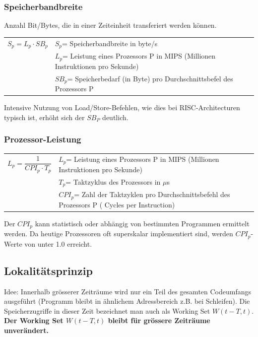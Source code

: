 \subsubsection{Speicherbandbreite}
Anzahl Bit/Bytes, die in einer Zeiteinheit transferiert werden können.\newline
\begin{tabular}{cl}
    $ S_p = L_p \cdot SB_p $&$ S_p $= Speicherbandbreite in byte/s\\
    & $ L_p $= Leistung eines Prozessors P in MIPS (Millionen Instruktionen pro Sekunde)\\
    &$ SB_p $= Speicherbedarf (in Byte) pro Durchschnittsbefel des Prozessors P\\   
\end{tabular}\newline
Intensive Nutzung von Load/Store-Befehlen, wie dies bei RISC-Architecturen typisch ist, erhöht sich der $ SB_P $ deutlich.

\subsubsection{Prozessor-Leistung}
\begin{tabular}{cl}
    $ L_p = \dfrac{1}{CPI_p \cdot T_p} $ & $ L_p $= Leistung eines Prozessors P in MIPS (Millionen Instruktionen pro Sekunde)\\
    &$ T_p $= Taktzyklus des Prozessors in $ \mu $s\\
    &$ CPI_p $= Zahl der Taktzyklen pro Durchschnittsbefehl des Prozessors P ( Cycles per Instruction)\\   
\end{tabular}
Der $ CPI_p $ kann statistisch oder abhängig von bestimmten Programmen ermittelt werden. Da heutige Prozessoren oft superskalar implementiert sind, werden $ CPI_p $-Werte von unter 1.0 erreicht.

\subsection{Lokalitätsprinzip}

Idee: Innerhalb grösserer Zeiträume wird nur ein Teil des gesamten Codeumfangs ausgeführt (Programm bleibt in ähnlichem Adressbereich z.B. bei Schleifen).
Die Speicherzugriffe in dieser Zeit bezeichnet man auch als Working Set $W(t-T,t)$.
\textbf{Der Working Set $W(t-T,t)$ bleibt für grössere Zeiträume unverändert.}

